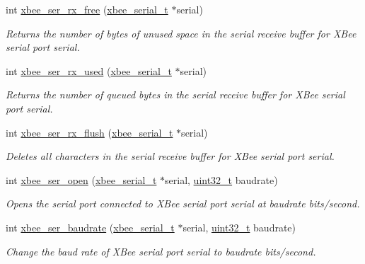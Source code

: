 \begin{DoxyCompactItemize}
int \hyperlink{group__xbee__serial_ga16fb431a1e66861439518e562431821f}{xbee\-\_\-ser\-\_\-rx\-\_\-free} (\hyperlink{structxbee__serial__t}{xbee\-\_\-serial\-\_\-t} $\ast$serial)
\begin{DoxyCompactList}\small\item\em Returns the number of bytes of unused space in the serial receive buffer for X\-Bee serial port {\itshape serial}. \end{DoxyCompactList}\item 
int \hyperlink{group__xbee__serial_ga43b8322771cc16b4130fa5330ad2242b}{xbee\-\_\-ser\-\_\-rx\-\_\-used} (\hyperlink{structxbee__serial__t}{xbee\-\_\-serial\-\_\-t} $\ast$serial)
\begin{DoxyCompactList}\small\item\em Returns the number of queued bytes in the serial receive buffer for X\-Bee serial port {\itshape serial}. \end{DoxyCompactList}\item 
int \hyperlink{group__xbee__serial_ga98a6d5ceb5e1445e8ef82ccaa65a8c15}{xbee\-\_\-ser\-\_\-rx\-\_\-flush} (\hyperlink{structxbee__serial__t}{xbee\-\_\-serial\-\_\-t} $\ast$serial)
\begin{DoxyCompactList}\small\item\em Deletes all characters in the serial receive buffer for X\-Bee serial port {\itshape serial}. \end{DoxyCompactList}\item 
int \hyperlink{group__xbee__serial_gaa615a221dd69c17ee2989c281f2bf04a}{xbee\-\_\-ser\-\_\-open} (\hyperlink{structxbee__serial__t}{xbee\-\_\-serial\-\_\-t} $\ast$serial, \hyperlink{group__hal__dos_ga09a1e304d66d35dd47daffee9731edaa}{uint32\-\_\-t} baudrate)
\begin{DoxyCompactList}\small\item\em Opens the serial port connected to X\-Bee serial port {\itshape serial} at {\itshape baudrate} bits/second. \end{DoxyCompactList}\item 
int \hyperlink{group__xbee__serial_gab3c12543a07e0669b672c5cab54b0926}{xbee\-\_\-ser\-\_\-baudrate} (\hyperlink{structxbee__serial__t}{xbee\-\_\-serial\-\_\-t} $\ast$serial, \hyperlink{group__hal__dos_ga09a1e304d66d35dd47daffee9731edaa}{uint32\-\_\-t} baudrate)
\begin{DoxyCompactList}\small\item\em Change the baud rate of X\-Bee serial port {\itshape serial} to {\itshape baudrate} bits/second. \end{DoxyCompactList}\item 

\end{DoxyCompactItemize}
